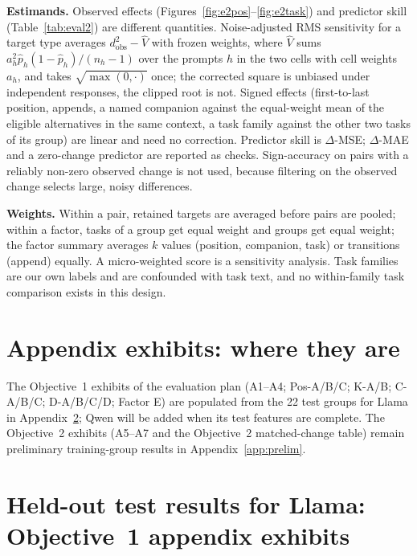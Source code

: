 \documentclass{article}
\newcommand{\phat}{\hat{p}}
\begin{document}
\textbf{Estimands.} Observed effects (Figures~\ref{fig:e2pos}--\ref{fig:e2task}) and predictor skill (Table~\ref{tab:eval2}) are different
quantities. Noise-adjusted RMS sensitivity for a target type averages $d_{\text{obs}}^2-\hat V$ with frozen weights,
where $\hat V$ sums $a_h^2\phat_h(1-\phat_h)/(n_h-1)$ over the prompts $h$ in the two cells with cell weights $a_h$, and
takes $\sqrt{\max(0,\cdot)}$ once; the corrected square is unbiased under independent responses, the clipped root is
not. Signed effects (first-to-last position, appends, a named companion against the equal-weight mean of the eligible
alternatives in the same context, a task family against the other two tasks of its group) are linear and need no
correction. Predictor skill is $\Delta$-MSE; $\Delta$-MAE and a zero-change predictor are reported as checks.
Sign-accuracy on pairs with a reliably non-zero observed change is not used, because filtering on the observed change
selects large, noisy differences.

\textbf{Weights.} Within a pair, retained targets are averaged before pairs are pooled; within a factor, tasks of a
group get equal weight and groups get equal weight; the factor summary averages $k$ values (position, companion, task)
or transitions (append) equally. A micro-weighted score is a sensitivity analysis. Task families are our own labels
and are confounded with task text, and no within-family task comparison exists in this design.

\section{Appendix exhibits: where they are}
\label{app:planned}

The Objective~1 exhibits of the evaluation plan (A1--A4; Pos-A/B/C; K-A/B; C-A/B/C; D-A/B/C/D; Factor E) are
populated from the 22 test groups for Llama in Appendix~\ref{app:test}; Qwen will be added when its test features are
complete. The Objective~2 exhibits (A5--A7 and the Objective~2 matched-change table) remain preliminary training-group
results in Appendix~\ref{app:prelim}.

\section{Held-out test results for Llama: Objective~1 appendix exhibits}
\label{app:test}
\end{document}
